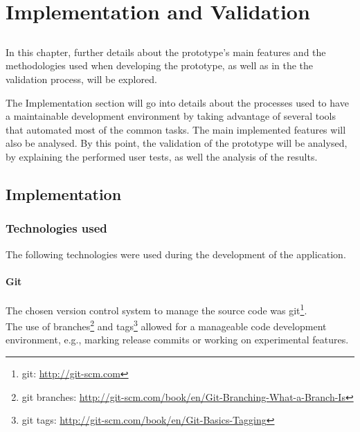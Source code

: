 

\chapter{Implementation and Validation}
\label{chap:chap4}

\section*{}

In this chapter, further details about the prototype's main features and the methodologies used when developing the prototype, as well as in the the validation process, will be explored.

The Implementation section will go into details about the processes used to have a maintainable development environment by taking advantage of several tools that automated most of the common tasks. The main implemented features will also be analysed.
By this point, the validation of the prototype will be analysed, by explaining the performed user tests, as well the analysis of the results.

\section{Implementation} %
\label{sec:implementation}

    
  \subsection{Technologies used} %
  \label{sub:technologies}

    The following technologies were used during the development of the application.

    \subsubsection{Git} %
    \label{ssub:git}
    
    The chosen version control system to manage the source code was git\footnote{git: \url{http://git-scm.com}}. \\
    The use of branches\footnote{git branches: \url{http://git-scm.com/book/en/Git-Branching-What-a-Branch-Is}} and tags\footnote{git tags: \url{http://git-scm.com/book/en/Git-Basics-Tagging}} allowed for a manageable code development environment, e.g., marking release commits or working on experimental features.

